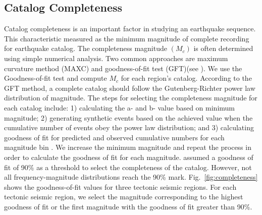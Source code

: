  
\subsection{Catalog Completeness}
\noindent
Catalog completeness is an important factor in studying an earthquake sequence. This characteristic measured as the minimum magnitude of complete recording for earthquake catalog. The completeness magnitude $(M_c)$ is often determined using simple numerical analysis. Two common approaches are maximum curvature method (MAXC) and goodness-of-fit test (GFT)(see \citet{Wiemer2000}). We use the Goodness-of-fit test and compute $M_c$ for each region's catalog. According to the GFT method, a complete catalog should follow the Gutenberg-Richter power law distribution of magnitude. The steps for selecting the completeness magnitude for each catalog include: 1) calculating the a-  and  b-  value based on minimum magnitude; 2) generating  synthetic events based on the achieved value when the cumulative number of events obey the power law distribution; and 3) calculating goodness of fit for predicted and observed cumulative numbers for each magnitude bin  \citep{Wiemer2000}. We increase the minimum magnitude and repeat the process in order to calculate the goodness of fit for each magnitude.  \citet{Wiemer2000} assumed a goodness of fit of 90\% as a threshold to select the completeness of the catalog. However,  not all frequency-magnitude distributions reach the 90\% mark. Fig.~\ref{fig:completeness} shows the goodness-of-fit values for three tectonic seismic regions. For each tectonic seismic region, we select the magnitude corresponding to the highest goodness of fit or the first magnitude with the goodness of fit greater than 90\%.


